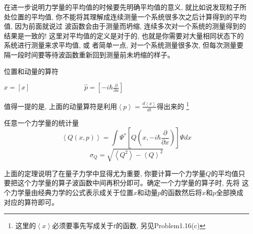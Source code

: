 \documentclass[a4paper,zihao=-4,linespread=1]{ctexrep}
\newenvironment{lequation}{\large\begin{equation}}{\end{equation}}
\begin{document}
    在进一步说明力学量的平均值的时候要先明确平均值的意义, 就比如说发现粒子所处位置的平均值, 你不能将其理解成连续测量一个系统很多次之后计算得到的平均值, 因为前面就说过
    波函数会由于测量而坍缩, 连续多次对一个系统的测量得到的结果是一致的! 这里对平均值的定义是对于的, 也就是你需要对大量相同状态下的系统进行测量来求平均值, 或
    者简单一点, 对一个系统测量很多次, 但每次测量要隔一段时间要等待波函数重新回到测量前未坍缩的样子。
    \begin{proposition}{位置和动量的算符}
        \begin{center}
            \begin{math}
                \displaystyle
                \hat{x}=[x] \qquad\qquad\qquad\qquad \hat{p}=\left[-i\hbar\frac{\partial}{\partial x}\right]    
            \end{math}
        \end{center}
        值得一提的是, 上面的动量算符是利用$\left \langle p \right \rangle=\frac{d\left \langle x \right \rangle}{dt}$得出来的
        \footnote[0]{这里的$\left \langle x \right \rangle$必须要事先写成关于$t$的函数, 另见Problem1.16(c)}
    \end{proposition}
    \begin{theorem}{任意一个力学量的统计量}
        \begin{lequation}
            \left \langle Q\left(x,p\right) \right \rangle=\int \Psi^{*}\left[Q\left(x,-i\hbar\frac{\partial}{\partial x}\right)\right]\Psi dx
        \end{lequation}
        \begin{equation}
            \sigma_Q = \sqrt{\left \langle Q^2 \right \rangle-\left \langle Q \right \rangle^2}
        \end{equation}
    \end{theorem}
    上面的定理说明了在量子力学中显得尤为重要, 你要计算一个力学量$Q$的平均值只要把这个力学量的算子波函数中间再积分即可。确定一个力学量的算子时, 先将
    这个力学量由经典力学的公式表示成关于位置$x$和动量$p$的函数然后将$x$和$p$全部换成对应的算符即可。
\end{document}

